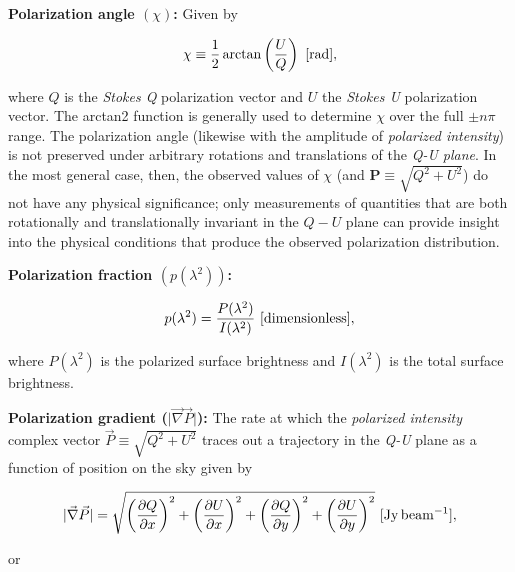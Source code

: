 \documentclass[a4paper,10pt]{article}
\begin{document}
{\noindent}\textbf{Polarization angle $(\chi)$:} Given by

\begin{align*}
    \chi\equiv\frac{1}{2}\arctan\left(\frac{U}{Q}\right) ~ [{\rm rad}],
\end{align*}

{\noindent}where $Q$ is the \textit{Stokes Q} polarization vector and $U$ the \textit{Stokes U} polarization vector. The arctan2 function is generally used to determine $\chi$ over the full $\pm n\pi$ range. The polarization angle (likewise with the amplitude of \textit{polarized intensity}) is not preserved under arbitrary rotations and translations of the \textit{Q-U plane}. In the most general case, then, the observed values of $\chi$ (and $\mathbf{P}\equiv\sqrt{Q^2+U^2}$) do not have any physical significance; only measurements of quantities that are both rotationally and translationally invariant in the $Q-U$ plane can provide insight into the physical conditions that produce the observed polarization distribution.

{\noindent}\textbf{Polarization fraction $(p(\lambda^2))$:}

\begin{align*}
    p(\lambda^2) = \frac{P(\lambda^2)}{I(\lambda^2)} ~ [{\rm dimensionless}],
\end{align*}

{\noindent}where $P(\lambda^2)$ is the polarized surface brightness and $I(\lambda^2)$ is the total surface brightness.

{\noindent}\textbf{Polarization gradient ($\lvert\vec{\nabla}\vec{P}\rvert$):} The rate at which the \textit{polarized intensity} complex vector $\vec{P}\equiv\sqrt{Q^2+U^2}$ traces out a trajectory in the \textit{Q-U} plane as a function of position on the sky given by

\begin{align*}
    \lvert\vec\nabla\vec{P}\rvert = \sqrt{\left(\frac{\partial Q}{\partial x}\right)^2 + \left(\frac{\partial U}{\partial x}\right)^2 + \left(\frac{\partial Q}{\partial y}\right)^2 + \left(\frac{\partial U}{\partial y}\right)^2} ~ [{\rm Jy\,beam^{-1}}],
\end{align*}

{\noindent}or
\end{document}
